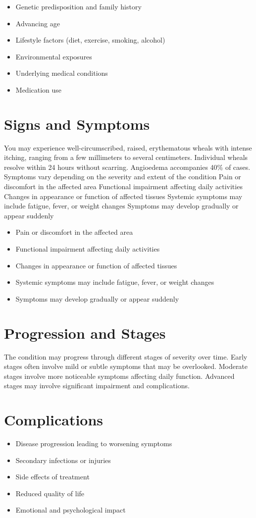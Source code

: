 \begin{itemize}[noitemsep]
  \item Genetic predisposition and family history
  \item Advancing age
  \item Lifestyle factors (diet, exercise, smoking, alcohol)
  \item Environmental exposures
  \item Underlying medical conditions
  \item Medication use
\end{itemize}
\section{Signs and Symptoms}
You may experience well-circumscribed, raised, erythematous wheals with intense itching, ranging from a few millimeters to several centimeters. Individual wheals resolve within 24 hours without scarring. Angioedema accompanies 40\% of cases. Symptoms vary depending on the severity and extent of the condition Pain or discomfort in the affected area Functional impairment affecting daily activities Changes in appearance or function of affected tissues Systemic symptoms may include fatigue, fever, or weight changes Symptoms may develop gradually or appear suddenly

\begin{itemize}[noitemsep]
  \item Pain or discomfort in the affected area
  \item Functional impairment affecting daily activities
  \item Changes in appearance or function of affected tissues
  \item Systemic symptoms may include fatigue, fever, or weight changes
  \item Symptoms may develop gradually or appear suddenly
\end{itemize}
\section{Progression and Stages}
The condition may progress through different stages of severity over time. Early stages often involve mild or subtle symptoms that may be overlooked. Moderate stages involve more noticeable symptoms affecting daily function. Advanced stages may involve significant impairment and complications.
\section{Complications}
\begin{itemize}[noitemsep]
  \item Disease progression leading to worsening symptoms
  \item Secondary infections or injuries
  \item Side effects of treatment
  \item Reduced quality of life
  \item Emotional and psychological impact
\end{itemize}
